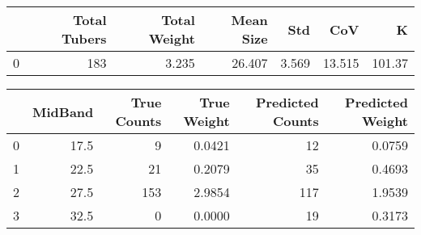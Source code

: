 \begin{tabular}{lrrrrrr}
\toprule
{} &  Total Tubers &  Total Weight &  Mean Size &    Std &     CoV &       K \\
\midrule
0 &           183 &         3.235 &     26.407 &  3.569 &  13.515 &  101.37 \\
\bottomrule
\end{tabular}

\begin{tabular}{lrrrrr}
\toprule
{} &  MidBand &  True Counts &  True Weight &  Predicted Counts &  Predicted Weight \\
\midrule
0 &     17.5 &            9 &       0.0421 &                12 &            0.0759 \\
1 &     22.5 &           21 &       0.2079 &                35 &            0.4693 \\
2 &     27.5 &          153 &       2.9854 &               117 &            1.9539 \\
3 &     32.5 &            0 &       0.0000 &                19 &            0.3173 \\
\bottomrule
\end{tabular}

